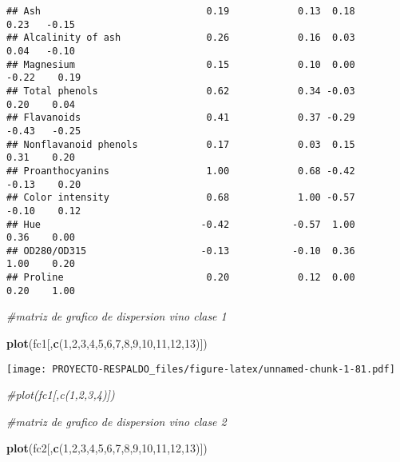 \documentclass[
]{article}
\newenvironment{Shaded}{\begin{snugshade}}{\end{snugshade}}
\newcommand{\CommentTok}[1]{\textcolor[rgb]{0.56,0.35,0.01}{\textit{#1}}}
\newcommand{\DecValTok}[1]{\textcolor[rgb]{0.00,0.00,0.81}{#1}}
\newcommand{\KeywordTok}[1]{\textcolor[rgb]{0.13,0.29,0.53}{\textbf{#1}}}
\newcommand{\NormalTok}[1]{#1}
\begin{document}
\begin{verbatim}
## Ash                             0.19            0.13  0.18        0.23   -0.15
## Alcalinity of ash               0.26            0.16  0.03        0.04   -0.10
## Magnesium                       0.15            0.10  0.00       -0.22    0.19
## Total phenols                   0.62            0.34 -0.03        0.20    0.04
## Flavanoids                      0.41            0.37 -0.29       -0.43   -0.25
## Nonflavanoid phenols            0.17            0.03  0.15        0.31    0.20
## Proanthocyanins                 1.00            0.68 -0.42       -0.13    0.20
## Color intensity                 0.68            1.00 -0.57       -0.10    0.12
## Hue                            -0.42           -0.57  1.00        0.36    0.00
## OD280/OD315                    -0.13           -0.10  0.36        1.00    0.20
## Proline                         0.20            0.12  0.00        0.20    1.00
\end{verbatim}

\begin{Shaded}
\begin{Highlighting}[]
\CommentTok{#matriz de grafico de dispersion vino clase 1}

\KeywordTok{plot}\NormalTok{(fc1[,}\KeywordTok{c}\NormalTok{(}\DecValTok{1}\NormalTok{,}\DecValTok{2}\NormalTok{,}\DecValTok{3}\NormalTok{,}\DecValTok{4}\NormalTok{,}\DecValTok{5}\NormalTok{,}\DecValTok{6}\NormalTok{,}\DecValTok{7}\NormalTok{,}\DecValTok{8}\NormalTok{,}\DecValTok{9}\NormalTok{,}\DecValTok{10}\NormalTok{,}\DecValTok{11}\NormalTok{,}\DecValTok{12}\NormalTok{,}\DecValTok{13}\NormalTok{)])}
\end{Highlighting}
\end{Shaded}

\texttt{[image: PROYECTO-RESPALDO\_files/figure-latex/unnamed-chunk-1-81.pdf]}

\begin{Shaded}
\begin{Highlighting}[]
\CommentTok{#plot(fc1[,c(1,2,3,4)])}


\CommentTok{#matriz de grafico de dispersion vino clase 2}

\KeywordTok{plot}\NormalTok{(fc2[,}\KeywordTok{c}\NormalTok{(}\DecValTok{1}\NormalTok{,}\DecValTok{2}\NormalTok{,}\DecValTok{3}\NormalTok{,}\DecValTok{4}\NormalTok{,}\DecValTok{5}\NormalTok{,}\DecValTok{6}\NormalTok{,}\DecValTok{7}\NormalTok{,}\DecValTok{8}\NormalTok{,}\DecValTok{9}\NormalTok{,}\DecValTok{10}\NormalTok{,}\DecValTok{11}\NormalTok{,}\DecValTok{12}\NormalTok{,}\DecValTok{13}\NormalTok{)])}
\end{Highlighting}
\end{Shaded}
\end{document}
